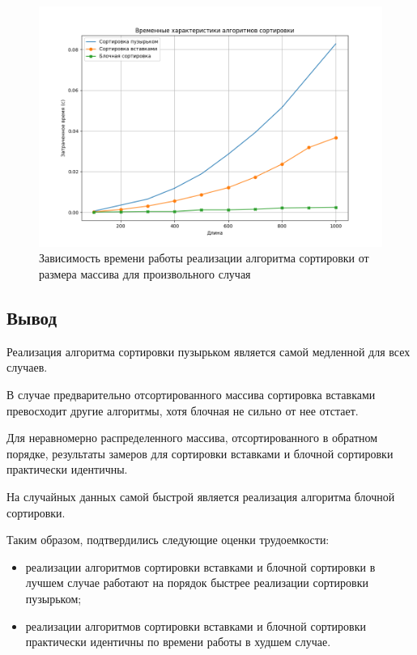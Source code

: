 \begin{figure}[h!btp]
	\centering
	\includegraphics[width=400pt]{inc/time-random.png}
	\caption{Зависимость времени работы реализации алгоритма сортировки от размера массива для произвольного случая}
	\label{fig:time-random}	
\end{figure}
\clearpage

\subsection{Вывод}
Реализация алгоритма сортировки пузырьком является самой медленной для всех случаев. 

В случае предварительно отсортированного массива сортировка вставками превосходит другие алгоритмы, хотя блочная не сильно от нее отстает.

Для неравномерно распределенного массива, отсортированного в обратном порядке, результаты замеров для сортировки вставками и блочной сортировки практически идентичны.

На случайных данных самой быстрой является реализация алгоритма блочной сортировки.

Таким образом, подтвердились следующие оценки трудоемкости:
\begin{itemize}
  \item реализации алгоритмов сортировки вставками и блочной сортировки в лучшем случае работают на порядок быстрее реализации сортировки пузырьком;
  \item реализации алгоритмов сортировки вставками и блочной сортировки практически идентичны по времени работы в худшем случае.
\end{itemize}
